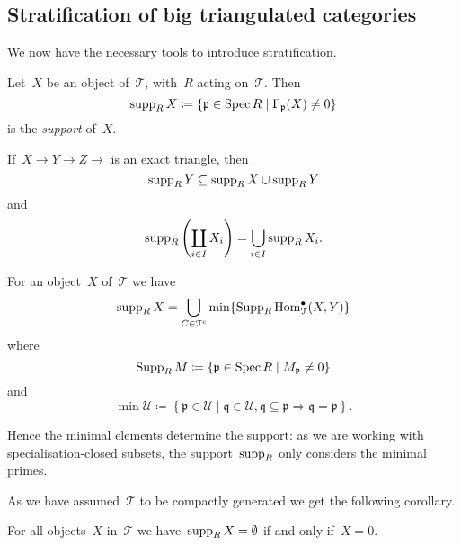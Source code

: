 \documentclass[10pt,a4paper]{article}
\begin{document}
\subsection{Stratification of big triangulated categories}
We now have the necessary tools to introduce stratification.
\begin{definition}
  Let~$X$ be an object of~$\mathcal{T}$, with~$R$ acting on~$\mathcal{T}$. Then
  \begin{equation}
    \operatorname{supp}_R X\coloneqq\left\{ \mathfrak{p}\in\operatorname{Spec} R\mid\Gamma_{\mathfrak{p}}(X)\neq 0 \right\}
  \end{equation}
  is the \emph{support} of~$X$.
\end{definition}
\begin{remark}
  If~$X\to Y\to Z\to$ is an exact triangle, then
  \begin{equation}
    \operatorname{supp}_R Y\subseteq\operatorname{supp}_R X\cup\operatorname{supp}_R Y
  \end{equation}
  and
  \begin{equation}
    \operatorname{supp}_R\left( \coprod_{i\in I}X_i \right)=\bigcup_{i\in I}\operatorname{supp}_R X_i.
  \end{equation}
\end{remark}

\begin{theorem}
  For an object~$X$ of~$\mathcal{T}$ we have
  \begin{equation}
    \operatorname{supp}_R X=\bigcup_{C\in\mathcal{T}^{\mathrm{c}}}\min\{\operatorname{Supp}_R\operatorname{Hom}_{\mathcal{T}}^\bullet(X,Y)\}
  \end{equation}
  where
  \begin{equation}
    \operatorname{Supp}_R M\coloneqq\left\{ \mathfrak{p}\in\operatorname{Spec} R\mid M_{\mathfrak{p}}\neq 0 \right\}
  \end{equation}
  and
  \begin{equation}
    \min\mathcal{U}\coloneqq\left\{ \mathfrak{p}\in\mathcal{U}\mid\mathfrak{q}\in\mathcal{U},\mathfrak{q}\subseteq\mathfrak{p}\Rightarrow\mathfrak{q}=\mathfrak{p} \right\}.
  \end{equation}
\end{theorem}
Hence the minimal elements determine the support: as we are working with specialisation-closed subsets, the support~$\operatorname{supp}_R$ only considers the minimal primes.

As we have assumed~$\mathcal{T}$ to be compactly generated we get the following corollary.
\begin{corollary}
  For all objects~$X$ in~$\mathcal{T}$ we have~$\operatorname{supp}_R X=\emptyset$ if and only if~$X=0$.
\end{corollary}
\end{document}
